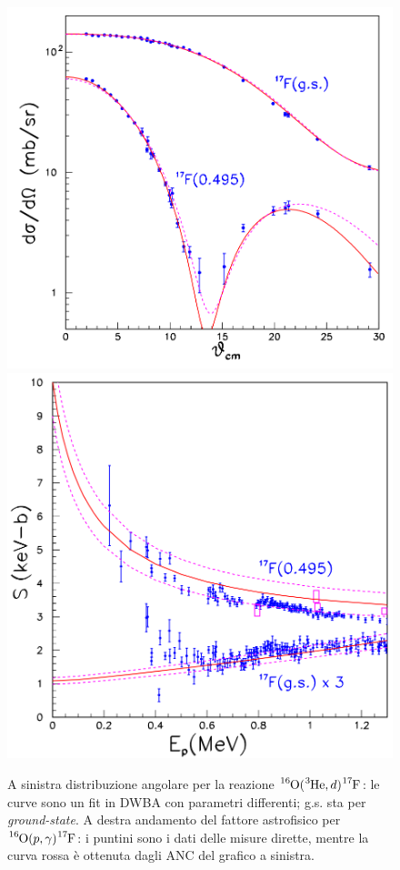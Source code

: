 \begin{figure}[!h]
	\centering
	\includegraphics[scale=0.4]{Immagini/0421_theta.png}
	\includegraphics[scale=0.4]{Immagini/0421_Ep.png}
	\caption{A sinistra distribuzione angolare per la reazione $\ce{^{16}O}(\ce{^3He},d)\ce{^{17}F}$: le curve sono un fit in DWBA con parametri differenti; g.s. sta per \textit{ground-state}. A destra andamento del fattore astrofisico per $\ce{^{16}O}(p,\gamma)\ce{^{17}F}$: i puntini sono i dati delle misure dirette, mentre la curva rossa è ottenuta dagli ANC del grafico a sinistra.}
	\label{0421_OpgF}
\end{figure}

